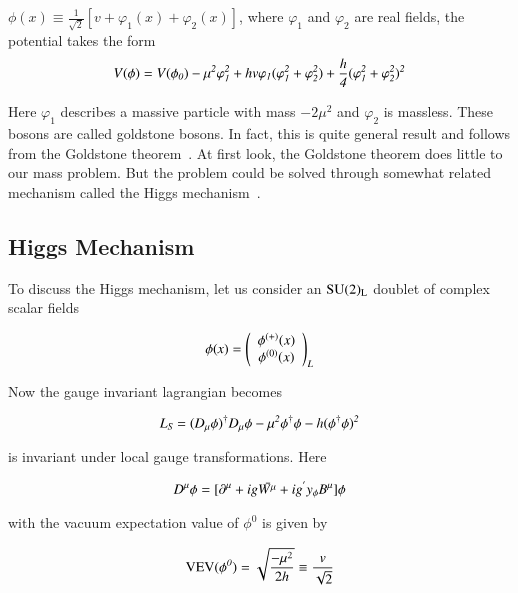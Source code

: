  

$\phi(x) \equiv \frac{1}{\sqrt{2}}[v+\varphi_{1}(x)+ \varphi_{2}(x)]$, where $\varphi_{1}$ and $\varphi_{2}$ are real fields, the potential takes the form 
\begin{align} \label{VafterPar}
\it V(\phi) = V(\phi_{0}) - \mu^{2}\varphi_{1}^{2} + hv\varphi_{1}(\varphi_{1}^{2} + \varphi_{2}^{2}) + \frac{h}{4}(\varphi_{1}^{2} + \varphi_{2}^{2})^{2}
\end{align}


Here $\varphi_{1}$ describes a massive particle with mass $-2\mu^{2}$ and $\varphi_{2}$ is massless. These bosons are called goldstone bosons. In fact, this is quite general result and follows from the Goldstone theorem~\cite{GSW}. At first look, the Goldstone theorem does little to our mass problem. But the problem could be solved through somewhat related mechanism called the Higgs mechanism~\cite{higgs, FR}.


\subsection{Higgs Mechanism}
To discuss the Higgs mechanism, let us consider an $\rm SU(2)_{L}$ doublet of complex scalar fields

\begin{equation} \label{eq1}
\it \phi(x) = \left( \begin{array}{cc} \phi^{(+)}(x)  \\ \phi^{(0)}(x)  \end{array} \right)_{L}
\end{equation}

 Now the gauge invariant lagrangian   becomes 

\begin{equation} \label{eq2HM}
\it L_{S} = (D_{\mu}\phi)^{\dagger} D_{\mu}\phi - \mu^{2}\phi^{\dagger}\phi - h(\phi^{\dagger}\phi)^{2} 
\end{equation}

is invariant under local gauge transformations. Here
 
\begin{equation} \label{eq3HM}
\it D^{\mu}\phi =  [\partial^{\mu} + ig\bar{W^{\mu}} + ig^{'}y_{\phi}B^{\mu}]\phi 
\end{equation}

with the vacuum expectation value of $\phi^{0}$ is given by

\begin{equation} \label{VEVHM}
\it {\rm VEV}(\phi^{0}) = \sqrt{\frac{-\mu^{2}}{2h}} \equiv \frac{v}{\sqrt{2}} 
\end{equation}


